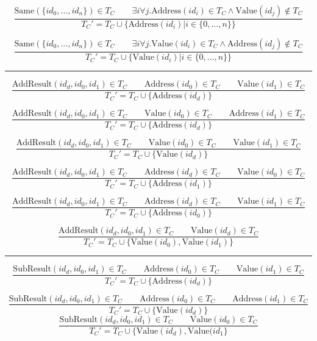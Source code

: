 \documentclass{article}
\begin{document}
\[
\frac{
    \mathrm{Same}(\{id_0,\ldots,id_n\})\in T_C
    \qquad
    \exists i \forall j. \mathrm{Address}(id_i) \in T_C \land \mathrm{Value}(id_j) \notin T_C
}{
    T_C' = T_C \cup \{\mathrm{Address}(id_i) | i \in \{0, \ldots, n\}\}
}
\]

\[
\frac{
    \mathrm{Same}(\{id_0,\ldots,id_n\})\in T_C
    \qquad
    \exists i \forall j. \mathrm{Value}(id_i) \in T_C \land \mathrm{Address}(id_j) \notin T_C
}{
    T_C' = T_C \cup \{\mathrm{Value}(id_i) | i \in \{0, \ldots, n\}\}
}
\]

\noindent\rule{\textwidth}{0.4pt}

\[
\frac{
    \mathrm{AddResult}(id_d,id_0,id_1)\in T_C
    \qquad \mathrm{Address}(id_0) \in T_C \qquad \mathrm{Value}(id_1) \in T_C
}{
    T_C' = T_C \cup \{\mathrm{Address}(id_d)\}
}
\]

\[
\frac{
    \mathrm{AddResult}(id_d,id_0,id_1)\in T_C
    \qquad \mathrm{Value}(id_0) \in T_C \qquad \mathrm{Address}(id_1) \in T_C
}{
    T_C' = T_C \cup \{\mathrm{Address}(id_d)\}
}
\]

\[
\frac{
    \mathrm{AddResult}(id_d,id_0,id_1)\in T_C
    \qquad \mathrm{Value}(id_0) \in T_C \qquad \mathrm{Value}(id_1) \in T_C
}{
    T_C' = T_C \cup \{\mathrm{Value}(id_d)\}
}
\]

\[
\frac{
    \mathrm{AddResult}(id_d,id_0,id_1)\in T_C
    \qquad \mathrm{Address}(id_d) \in T_C \qquad \mathrm{Value}(id_0) \in T_C
}{
    T_C' = T_C \cup \{\mathrm{Address}(id_1)\}
}
\]

\[
\frac{
    \mathrm{AddResult}(id_d,id_0,id_1)\in T_C
    \qquad \mathrm{Address}(id_d) \in T_C \qquad \mathrm{Value}(id_1) \in T_C
}{
    T_C' = T_C \cup \{\mathrm{Address}(id_0)\}
}
\]

\[
\frac{
    \mathrm{AddResult}(id_d,id_0,id_1)\in T_C
    \qquad \mathrm{Value}(id_d) \in T_C
}{
    T_C' = T_C \cup \{\mathrm{Value}(id_0), \mathrm{Value}(id_1)\}
}
\]

\noindent\rule{\textwidth}{0.4pt}

\[
\frac{
    \mathrm{SubResult}(id_d,id_0,id_1)\in T_C
    \qquad \mathrm{Address}(id_0) \in T_C \qquad \mathrm{Value}(id_1) \in T_C
}{
    T_C' = T_C \cup \{\mathrm{Address}(id_d)\}
}
\]

\[
\frac{
    \mathrm{SubResult}(id_d,id_0,id_1)\in T_C
    \qquad \mathrm{Address}(id_0) \in T_C \qquad \mathrm{Address}(id_1) \in T_C
}{
    T_C' = T_C \cup \{\mathrm{Value}(id_d)\}
}
\]
\[
\frac{
    \mathrm{SubResult}(id_d,id_0,id_1)\in T_C
    \qquad \mathrm{Value}(id_0) \in T_C
}{
    T_C' = T_C \cup \{\mathrm{Value}(id_d), \mathrm{Value}(id_1\}
}
\]
\end{document}
